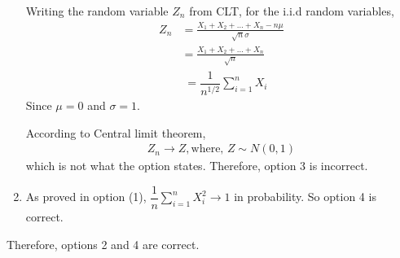 \documentclass[journal,12pt,twocolumn]{IEEEtran}
\begin{document}
\begin{enumerate}
Writing the random variable $Z_n$ from CLT, for the i.i.d random variables,
\begin{align}
    Z_n &= \frac{X_1 + X_2 + \ldots + X_n - n\mu}{\sqrt{n}\sigma}\\
    &= \frac{X_1 + X_2 + \ldots + X_n}{\sqrt{n}}
\end{align}
\begin{align}
    &= \dfrac{1}{n^{1/2}} \sum_{i=1}^n X_i
\end{align}
Since $\mu = 0$ and $\sigma = 1$.

According to Central limit theorem, 
\begin{align}
    Z_n \to Z, \text{where, } Z \sim N(0,1)
\end{align}
which is not what the option states. Therefore, option 3 is incorrect.

\item As proved in option (1), $\dfrac{1}{n}\sum_{i=1}^n X_i^2 \to 1$ in probability. So option 4 is correct.
\end{enumerate}
Therefore, options 2 and 4 are correct.
\end{document}

